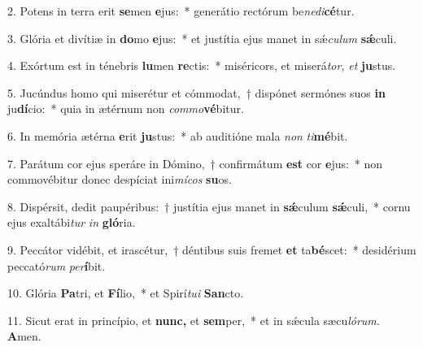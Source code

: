 \item 2. Potens in terra erit \textbf{se}men \textbf{e}jus:~* generátio rectórum be\textit{nedi}\textbf{cé}tur.
\item 3. Glória et divítiæ in \textbf{do}mo \textbf{e}jus:~* et justítia ejus manet in sǽ\hspace{0.03em}\textit{culum} \textbf{sǽ}culi.
\item 4. Exórtum est in ténebris \textbf{lu}men \textbf{re}ctis:~* miséricors, et miserá\hspace{0.03em}\textit{tor,} \textit{et} \textbf{ju}stus.
\item 5. Jucúndus homo qui miserétur et cómmodat,~† dispónet sermónes suos \textbf{in} ju\textbf{dí}cio:~* quia in ætérnum non \textit{commo}\textbf{vé}bitur.
\item 6. In memória ætérna \textbf{e}rit \textbf{ju}stus:~* ab auditióne mala \textit{non} \textit{ti}\textbf{mé}bit.
\item 7. Parátum cor ejus speráre in Dómino,~† confirmátum \textbf{est} cor \textbf{e}jus:~* non commovébitur donec despíciat ini\textit{mícos} \textbf{su}os.
\item 8. Dispérsit, dedit paupéribus:~† justítia ejus manet in \textbf{sǽ}culum \textbf{sǽ}culi,~* cornu ejus exaltábi\hspace{0.03em}\textit{tur} \textit{in} \textbf{gló}ria.
\item 9. Peccátor vidébit, et irascétur,~† déntibus suis fremet \textbf{et} ta\textbf{bé}scet:~* desidérium peccató\textit{rum} \textit{per}\textbf{í}bit.
\item 10. Glória \textbf{Pa}tri, et \textbf{Fí}lio,~* et Spirí\hspace{0.03em}\textit{tui} \textbf{San}cto.
\item 11. Sicut erat in princípio, et \textbf{nunc,} et \textbf{sem}per,~* et in sǽcula sæcu\hspace{0.03em}\textit{lórum.} \textbf{A}men.
